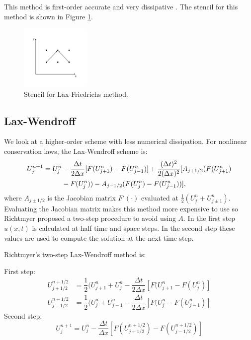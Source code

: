 \documentclass[letterpaper]{article}
\newcommand{\Dt}{\Delta t}
\newcommand{\Dx}{\Delta x}
\begin{document}
This method is first-order accurate and very dissipative \cite{LeVequetext}. The stencil for this method is shown in Figure 
\ref{fig:stencil_laxfried}. \\

\begin{figure}[H]
\centering
\includegraphics[trim = 10mm 20mm 10mm 15mm, width=0.3\textwidth]{Laxfried.png}
\caption{Stencil for Lax-Friedrichs method.}
\label{fig:stencil_laxfried}
\end{figure}


\subsection{Lax-Wendroff}
We look at a higher-order scheme with less numerical dissipation. For nonlinear conservation laws, the Lax-Wendroff scheme is: 
\begin{align}
U^{n+1}_j = U^n_j &- \dfrac{\Dt}{2 \Dx}[F(U^n_{j+1}) - F(U^n_{j-1})] + \dfrac{(\Dt)^2}{2 (\Dx)^2}[A_{j+1/2}(F(U^n_{j+1}) \notag \\ 
&- F(U^n_j)) - A_{j-1/2}(F(U^n_j)- F(U^n_{j-1}))],
\end{align}
where $A_{j\pm 1/2}$ is the Jacobian matrix $F'(\cdot)$ evaluated at $\frac{1}{2}(U^n_j + U^n_{j\pm1})$. Evaluating the Jacobian matrix makes this method more expensive to use so Richtmyer proposed a two-step procedure to avoid using $A$. In the first step $u(x,t)$ is calculated at half time and space steps. In the second step these values are used to compute the solution at the next time step. 

Richtmyer's two-step Lax-Wendroff method is: 

First step:
\begin{align}
U^{n+1/2}_{j+1/2} &= \dfrac{1}{2}(U^n_{j+1} + U^n_j - \dfrac{\Dt}{2 \Dx} [F(U^n_{j+1} - F(U^n_j)] \\
U^{n+1/2}_{j-1/2} &= \dfrac{1}{2}(U^n_j + U^n_{j-1} - \dfrac{\Dt}{2 \Dx} [F(U^n_j - F(U^n_{j-1})]
\end{align}
Second step:
\begin{equation}
U^{n+1}_j = U^n_j - \dfrac{\Dt}{\Dx}[F(U^{n+1/2}_{j+1/2}) - F(U^{n+1/2}_{j-1/2})]
\end{equation}
\end{document}
